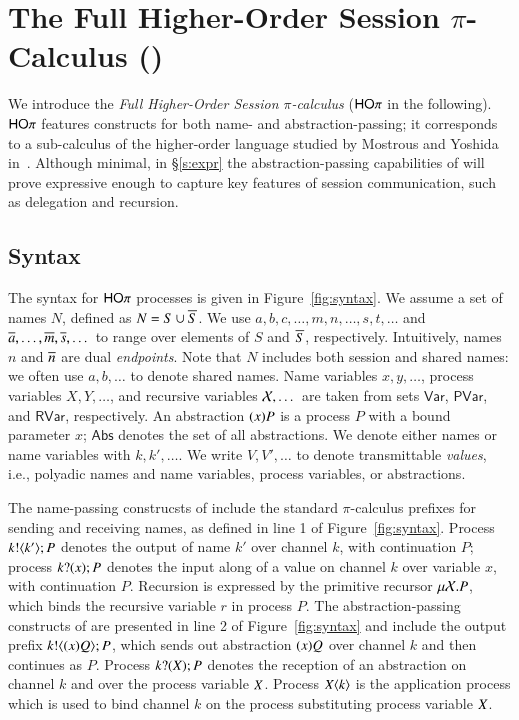 
\section{The Full Higher-Order Session $\pi$-Calculus (\HOp)}

We introduce the {\em Full Higher-Order Session $\pi$-calculus}
($\mathsf{HO}\pi$ in the following).
$\mathsf{HO}\pi$ features constructs for both name- and abstraction-passing;
it corresponds to a sub-calculus 
of the higher-order language studied by Mostrous and Yoshida in~\cite{tlca07}.
Although minimal, in \S\ref{s:expr}
the abstraction-passing capabilities of \HOp will prove 
expressive enough to capture key features of session communication, 
such as delegation and recursion.

\subsection{Syntax}

The syntax for $\mathsf{HO}\pi$ processes is given in Figure~\ref{fig:syntax}.
We assume a set of names $N$, defined as $N = S \cup \overline{S}$.
We use $a,b,c, \dots, m, n, \dots, s, t, \dots$ 
and $\overline{a}, \dots, \overline{m}, \overline{s}, \dots$
to range over elements of $S$ and $\overline{S}$, respectively.
Intuitively, names $n$ and $\overline{n}$ are dual \emph{endpoints}.
Note that $N$ includes both session and shared names:
we often use  $a,b, \dots$ to denote shared names.
Name variables $x, y,  \dots$, 
process variables $X, Y,  \dots$,
and recursive variables $\mathcal{X}, \dots$ 
are taken from sets $\mathsf{Var}$, $\mathsf{PVar}$, and $\mathsf{RVar}$, respectively. 
An abstraction $(x)P$ is a process $P$ with a bound parameter $x$;
$\mathsf{Abs}$ denotes the set of all abstractions.
We denote either names or name variables with $k, k', \dots$.
We write $V, V', \ldots$ to denote 
transmittable \emph{values}, i.e., 
polyadic names and name variables, process variables, or abstractions.

The name-passing construcsts of \HOp include the
standard $\pi$-calculus prefixes for sending and receiving names,
as defined in line 1 of Figure~\ref{fig:syntax}.
Process $k ! \langle k' \rangle ; P$ denotes the output of name $k'$ over channel $k$,
with continuation $P$;
process $k ? (x) ; P$ denotes the input along  of a value
on channel $k$ over variable $x$, with continuation $P$. 
Recursion is expressed by the primitive recursor $\mu \mathcal{X}. P$,
which binds the recursive variable $r$ in process $P$.
The abstraction-passing constructs of \HOp are presented in line
2 of Figure~\ref{fig:syntax} and include 
the output prefix $k ! \langle (x)Q \rangle ; P$, which 
sends out abstraction $(x)Q$ over channel $k$ and then continues as $P$. 
Process $k ? (X) ; P$ denotes the reception of an abstraction
on channel $k$ and over the process variable $X$.
Process $X\langle k \rangle$ is the application
process which is used to bind channel $k$ on the process
substituting process variable $X$.

